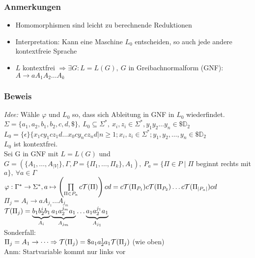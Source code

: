         \subsubsection{Anmerkungen}
            \begin{itemize}
                \item Homomorphismen sind leicht zu berechnende Reduktionen
                \item Interpretation: Kann eine Maschine $L_0$ entscheiden, so auch jede andere kontextfreie Sprache
                \item $L$ kontextfrei $\Rightarrow\exists G:L=L(G),\ G$ in Greibachnormalform (GNF):
                \subitem $A\rightarrow aA_1A_2\dots A_k$
            \end{itemize}
        \subsubsection{Beweis}
            \emph{Idee:} Wähle $\varphi$ und $L_0$ so, dass sich Ableitung in GNF in $L_0$ wiederfindet.\\[0.2cm]
            $\Sigma=\{a_1,a_2,b_1,b_2,c,d,\$\},\ L_0\subseteq \Sigma^*,\ x_i,z_i\in\Sigma^*, y_1y_2\dots y_n\in\$\mathds{D}_2$\\
				$L_0 = \{\epsilon\}\{x_1cy_1cz_1d\dots x_0cy_ncz_nd| n\geq 1;x_i,z_i \in \Sigma^*; y_1,y_2,\dots,y_n\in \$\mathbb{D}_2$\\
            $L_0$ ist kontextfrei.\\[0,2cm]
            Sei G in GNF mit $L=L(G)$ und $G=\left(\{A_1,\dots,A_{|V|}\},\Gamma,P=\{\Pi_1,\dots,\Pi_k\},A_1\right),\ P_a=\{\Pi\in P\mid \Pi$ beginnt rechts mit $a\},\ \forall a\in\Gamma$\\
            $\varphi:\Gamma^*\rightarrow\Sigma^*, a\mapsto \left(\prod\limits_{\Pi\in P_a}c\mathcal{T}(\Pi)\right)cd=c\mathcal{T}(\Pi_{P_1})c\mathcal{T}(\Pi_{P_2})\dots c\mathcal{T}(\Pi_{|P_a|})cd$\\
            $\Pi_j=A_i\rightarrow aA_{j_1}\dots A_{j_m}$\\
            $\mathcal{T}(\Pi_j)=\underbrace{b_1b_2^ib_1}_{A_i}\underbrace{a_1a_2^{j_m}a_1}_{A_{j_m}}\dots \underbrace{a_1a_2^{j_1}a_1}_{A_{j_1}}$\\
            Sonderfall:\\
            $\Pi_j=A_1\rightarrow\dots \Rightarrow \mathcal{T}(\Pi_j)=\$a_1a_2^1a_1\mathcal{T}(\Pi_j)$ (wie oben)\\
            Anm: Startvariable kommt nur links vor

